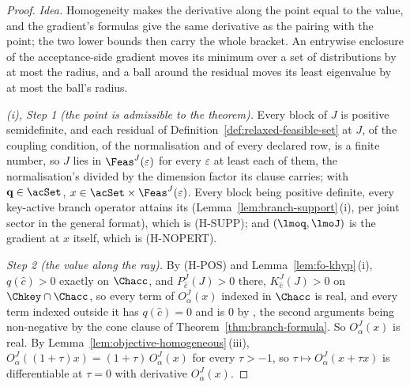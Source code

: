 \begin{proof}
\emph{Idea.} Homogeneity makes the derivative along the point equal to the
value, and the gradient's formulas give the same derivative as the pairing
with the point; the two lower bounds then carry the whole bracket. An
entrywise enclosure of the acceptance-side gradient moves its minimum over a
set of distributions by at most the radius, and a ball around the residual
moves its least eigenvalue by at most the ball's radius.

\emph{(i), Step 1 (the point is admissible to the theorem).} Every block of
$J$ is positive semidefinite, and each residual of
Definition~\ref{def:relaxed-feasible-set} at $J$, of the coupling condition,
of the normalisation and of every declared row, is a finite number, so $J$
lies in $\Feas^{J}(\varepsilon)$ for every $\varepsilon$ at least each of
them, the normalisation's divided by the dimension factor its clause
carries; with
$\mathbf q\in\acSet$, $x\in\acSet\times\Feas^{J}(\varepsilon)$. Every block
being positive definite, every key-active branch operator attains its
 (Lemma~\ref{lem:branch-support}\,(i), per joint
sector in the general format), which is (H-SUPP); and $(\lmoq,\lmoJ)$ is the
gradient at $x$ itself, which is (H-NOPERT).

\emph{Step 2 (the value along the ray).} By (H-POS) and
Lemma~\ref{lem:fo-khyp}\,(i), $q(\hat c)>0$ exactly on $\Chacc$, and
$P^{J}_{\hat c}(J)>0$ there, $K^{J}_{\hat c}(J)>0$ on $\Chkey\cap\Chacc$, so
every term of $O^{J}_{\alpha}(x)$ indexed in $\Chacc$ is real, and every
term indexed outside it has $q(\hat c)=0$ and is $0$ by
, the second arguments being non-negative by the
cone clause of Theorem~\ref{thm:branch-formula}. So $O^{J}_{\alpha}(x)$ is
real. By Lemma~\ref{lem:objective-homogeneous}\,(iii),
$O^{J}_{\alpha}((1+\tau)x)=(1+\tau)\,O^{J}_{\alpha}(x)$ for every
$\tau>-1$, so $\tau\mapsto O^{J}_{\alpha}(x+\tau x)$ is differentiable at
$\tau=0$ with derivative $O^{J}_{\alpha}(x)$.


\end{proof}
